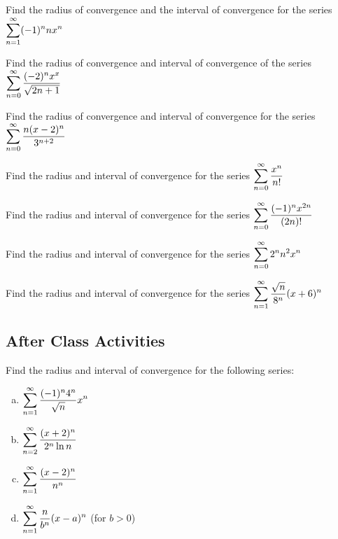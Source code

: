 \documentclass[notes]{subfiles}
\begin{document}
		\begin{ex}
			Find the radius of convergence and the interval of convergence for the series $\displaystyle \sum_{n=1}^\infty (-1)^n nx^n$
		\end{ex}
			\newpage
			
		\begin{ex}
			Find the radius of convergence and interval of convergence of the series $\displaystyle \sum_{n=0}^\infty \dfrac{(-2)^nx^x}{\sqrt{2n+1}}$
		\end{ex}
			
		\begin{ex}
			Find the radius of convergence and interval of convergence for the series $\displaystyle \sum_{n=0}^\infty \dfrac{n(x-2)^n}{3^{n+2}}$
		\end{ex}
			\newpage
			
		\begin{ex}
			Find the radius and interval of convergence for the series $\displaystyle \sum_{n=0}^\infty \dfrac{x^n}{n!}$
		\end{ex}
			
		\begin{ex}
			Find the radius and interval of convergence for the series $\displaystyle \sum_{n=0}^\infty \dfrac{(-1)^nx^{2n}}{(2n)!}$
		\end{ex}
			\newpage
			
		\begin{ex}
			Find the radius and interval of convergence for the series $\displaystyle \sum_{n=0}^\infty 2^nn^2x^n$
		\end{ex}
			
		\begin{ex}
			Find the radius and interval of convergence for the series $\displaystyle \sum_{n=1}^\infty \dfrac{\sqrt{n}}{8^n}(x+6)^n$
		\end{ex}
			\newpage
			
	\subsection*{After Class Activities}
		\begin{ex}
			Find the radius and interval of convergence for the following series:
			\begin{enumerate}[(a)]
				\item $\displaystyle \sum_{n=1}^\infty \dfrac{(-1)^n4^n}{\sqrt{n}}x^n$
					
				\item $\displaystyle \sum_{n=2}^\infty \dfrac{(x+2)^n}{2^n\ln n}$
					
				\item $\displaystyle \sum_{n=1}^\infty \dfrac{(x-2)^n}{n^n}$
					\newpage
					
				\item $\displaystyle \sum_{n=1}^\infty \dfrac{n}{b^n}(x-a)^n$ (for $b > 0$)
			\end{enumerate}
		\end{ex}
		
\end{document}
